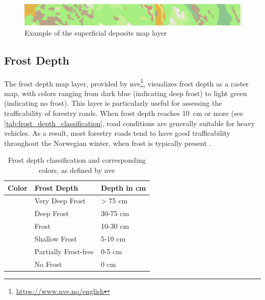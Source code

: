 \begin{figure}[h]
    \centering
    \includegraphics[width=1\linewidth]{images/maplayers/superficialdeposits.png}
    \caption{Example of the superficial deposits map layer}
    \label{fig:maplayer:superficialdeposit}
\end{figure}

\subsection{Frost Depth}\label{subsec:frostdepth}

The frost depth map layer, provided by \acrfull{nve}\footnote{\url{https://www.nve.no/english}}, visualizes frost depth as a raster map, with colors ranging from dark blue (indicating deep frost) to light green (indicating no frost). This layer is particularly useful for assessing the trafficability of forestry roads. When frost depth reaches \qty{10}{\centi\meter} or more (see \autoref{tab:frost_depth_classification}, road conditions are generally suitable for heavy vehicles. As a result, most forestry roads tend to have good trafficability throughout the Norwegian winter, when frost is typically present \cite{wiki:tele}.

\begin{table}[h]
    \centering
    \begin{tabular}{|l|l|l|}
        \hline  
        \textbf{Color} & \textbf{Frost Depth} & \textbf{Depth in cm} \\
        \hline
        \cellcolor[HTML]{00009c} & Very Deep Frost & > 75 cm \\
        \hline
        \cellcolor[HTML]{0018ff} & Deep Frost & 30-75 cm \\
        \hline
        \cellcolor[HTML]{009aff} & Frost & 10-30 cm \\
        \hline
        \cellcolor[HTML]{84ebff} & Shallow Frost & 5-10 cm \\
        \hline
        \cellcolor[HTML]{deffff} & Partially Frost-free & 0-5 cm \\
        \hline
        \cellcolor[HTML]{cef77b} & No Frost & 0 cm \\
        \hline
    \end{tabular}
    \caption[Frost depth classification and corresponding colors]{Frost depth classification and corresponding colors, as defined by \acrshort{nve} \cite{nve2025waterdata}}
    \label{tab:frost_depth_classification}
\end{table}

